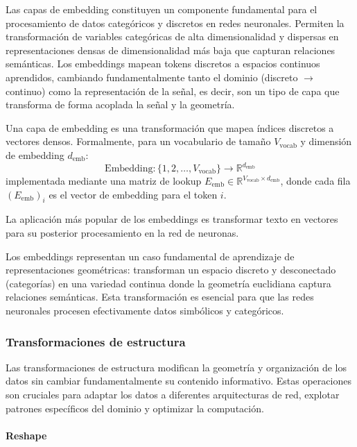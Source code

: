 Las capas de embedding constituyen un componente fundamental para el procesamiento de datos categóricos y discretos en redes neuronales. Permiten la transformación de variables categóricas de alta dimensionalidad y dispersas en representaciones densas de dimensionalidad más baja que capturan relaciones semánticas. Los embeddings mapean tokens discretos a espacios continuos aprendidos, cambiando fundamentalmente tanto el dominio (discreto $\to$ continuo) como la representación de la señal, es decir, son un tipo de capa que transforma de forma acoplada la señal y la geometría.

\begin{definition}\label{def:capa_embedding}
	Una capa de embedding es una transformación que mapea índices discretos a vectores densos. Formalmente, para un vocabulario de tamaño $V_{\text{vocab}}$ y dimensión de embedding $d_{\text{emb}}$:
	\[
	\text{Embedding}: \{1, 2, \ldots, V_{\text{vocab}}\} \to \mathbb{R}^{d_{\text{emb}}}
	\]
	implementada mediante una matriz de lookup $E_{\text{emb}} \in \mathbb{R}^{V_{\text{vocab}} \times d_{\text{emb}}}$, donde cada fila $(E_{\text{emb}})_i$ es el vector de embedding para el token $i$.
\end{definition}

La aplicación más popular de los embeddings es transformar texto en vectores para su posterior procesamiento en la red de neuronas.

Los embeddings representan un caso fundamental de aprendizaje de representaciones geométricas: transforman un espacio discreto y desconectado (categorías) en una variedad continua donde la geometría euclidiana captura relaciones semánticas. Esta transformación es esencial para que las redes neuronales procesen efectivamente datos simbólicos y categóricos.

\subsubsection{Transformaciones de estructura}

Las transformaciones de estructura modifican la geometría y organización de los datos sin cambiar fundamentalmente su contenido informativo. Estas operaciones son cruciales para adaptar los datos a diferentes arquitecturas de red, explotar patrones específicos del dominio y optimizar la computación.

\paragraph{Reshape}

